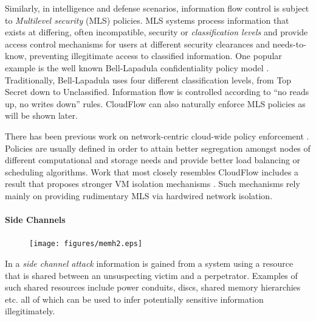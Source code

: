 
Similarly, in intelligence and defense scenarios, information flow control
is subject to \textit{Multilevel security} (MLS) policies.  MLS systems
process information that exists at differing, often incompatible, security
or \textit{classification levels} and provide access control mechanisms for
users at different security clearances and needs-to-know, preventing
illegitimate access to classified information.  One popular example 
is the well known Bell-Lapadula confidentiality policy model
\cite{BellLapadula}.  Traditionally, Bell-Lapadula uses four different
classification levels, from Top Secret down to Unclassified. Information
flow is controlled according to ``no reads up, no writes down'' rules. 
CloudFlow can also naturally enforce MLS policies as will be shown later.

There has been previous work on network-centric cloud-wide policy
enforcement \cite{CloudEncPolicy10,NetODESSA,CloudProfit12,CloudPower12,AllocationPolicy10}. Policies are usually defined in order to attain better
segregation amongst nodes of different computational and storage needs and
provide better load balancing or scheduling algorithms.  Work that most
closely resembles CloudFlow includes a result that proposes stronger VM isolation
mechanisms \cite{Mushi}.  Such mechanisms rely mainly on providing
rudimentary MLS via hardwired network isolation.


\paragraph{\bf Side Channels}

\begin{figure}
\vspace{-10pt}
\texttt{[image: figures/memh2.eps]}
\vspace{-25pt}
\label{cloudflow:figure:memh}
\end{figure}

In a {\em side channel attack} information is gained
from a system using a resource that is shared between an unsuspecting victim and a perpetrator.  Examples of such shared resources include power conduits, discs, shared memory hierarchies etc. all of which can be used to infer potentially sensitive information illegitimately.

